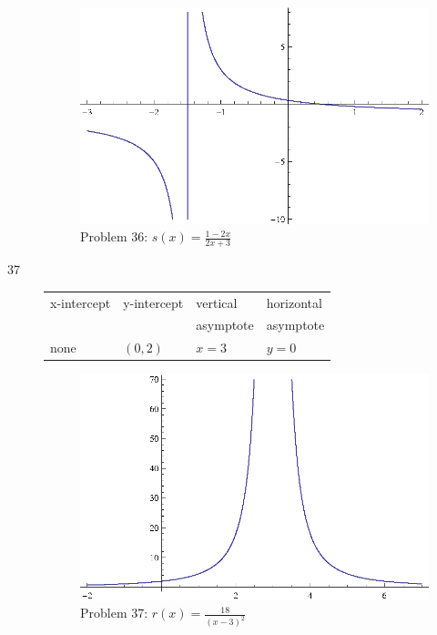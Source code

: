 \documentclass{exam}
\begin{document}
\begin{description}
      \begin{figure}[H]
        \centering
        \includegraphics[scale = 0.8]{problem36.eps}
        \caption*{Problem 36: $s(x) = \frac{1 - 2x}{2x + 3}$}
      \end{figure}

    \item[37]
      \begin{tabular}{llll}
        \toprule
        x-intercept & y-intercept & vertical  & horizontal \\
                    &             & asymptote & asymptote \\
        \midrule
        none        & $(0, 2)$    & $x = 3$   & $y = 0$ \\
        \bottomrule
      \end{tabular}

      \begin{figure}[H]
        \centering
        \includegraphics[scale = 0.8]{problem37.eps}
        \caption*{ Problem 37: $r(x) = \frac{18}{(x - 3)^2}$ }
      \end{figure}


\end{description}
\end{document}
